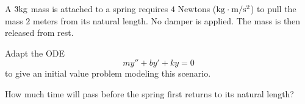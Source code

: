 
\begin{applicationActivities}
\begin{activity}{20}
A \(3\rm kg\) mass is attached to a spring requires \(4\) Newtons (\(\rm kg\cdot m/s^2\)) to
pull the mass \(2\) meters from its natural length. No damper is applied. The mass
is then released from rest.
\begin{subactivity}
Adapt the ODE \[my''+by'+ky=0\] to give an initial value problem modeling this scenario.
\end{subactivity}
\begin{subactivity}
How much time will pass before the spring first returns to its natural length? 
\end{subactivity}
\end{activity}
\end{applicationActivities}
